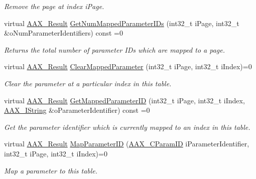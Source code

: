 \begin{DoxyCompactItemize}
\begin{DoxyCompactList}\small\item\em Remove the page at index {\ttfamily i\+Page}. \end{DoxyCompactList}\item 
virtual \mbox{\hyperlink{a00392_a4d8f69a697df7f70c3a8e9b8ee130d2f}{A\+A\+X\+\_\+\+Result}} \mbox{\hyperlink{a01725_a5fe90fe5ca247a2111ff8892861daefb}{Get\+Num\+Mapped\+Parameter\+I\+Ds}} (int32\+\_\+t i\+Page, int32\+\_\+t \&o\+Num\+Parameter\+Identifiers) const =0
\begin{DoxyCompactList}\small\item\em Returns the total number of parameter I\+Ds which are mapped to a page. \end{DoxyCompactList}\item 
virtual \mbox{\hyperlink{a00392_a4d8f69a697df7f70c3a8e9b8ee130d2f}{A\+A\+X\+\_\+\+Result}} \mbox{\hyperlink{a01725_a15914845dbf7bc309f07f11b05e89016}{Clear\+Mapped\+Parameter}} (int32\+\_\+t i\+Page, int32\+\_\+t i\+Index)=0
\begin{DoxyCompactList}\small\item\em Clear the parameter at a particular index in this table. \end{DoxyCompactList}\item 
virtual \mbox{\hyperlink{a00392_a4d8f69a697df7f70c3a8e9b8ee130d2f}{A\+A\+X\+\_\+\+Result}} \mbox{\hyperlink{a01725_ae46125c9ca6f75f5a7bfbf523506c2b7}{Get\+Mapped\+Parameter\+ID}} (int32\+\_\+t i\+Page, int32\+\_\+t i\+Index, \mbox{\hyperlink{a01873}{A\+A\+X\+\_\+\+I\+String}} \&o\+Parameter\+Identifier) const =0
\begin{DoxyCompactList}\small\item\em Get the parameter identifier which is currently mapped to an index in this table. \end{DoxyCompactList}\item 
virtual \mbox{\hyperlink{a00392_a4d8f69a697df7f70c3a8e9b8ee130d2f}{A\+A\+X\+\_\+\+Result}} \mbox{\hyperlink{a01725_a7897faf269ab1d6aa56fcf463fbac783}{Map\+Parameter\+ID}} (\mbox{\hyperlink{a00392_a1440c756fe5cb158b78193b2fc1780d1}{A\+A\+X\+\_\+\+C\+Param\+ID}} i\+Parameter\+Identifier, int32\+\_\+t i\+Page, int32\+\_\+t i\+Index)=0
\begin{DoxyCompactList}\small\item\em Map a parameter to this table. \end{DoxyCompactList}\end{DoxyCompactItemize}


